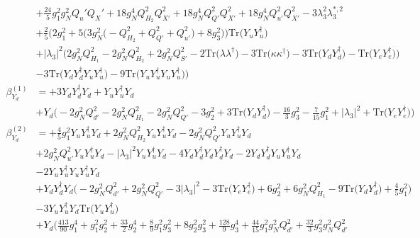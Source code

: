 {\begin{align}
 &+\frac{24}{5} g_{1}^{2} g_{N}^{2} Q_u' Q_X' +18 g_{N}^{4} Q_{H_2}^{2} Q_{X'}^{2} +18 g_{N}^{4} Q_{Q'}^{2} Q_{X'}^{2} +18 g_{N}^{4} Q_{u'}^{2} Q_{X'}^{2} -3 \lambda_{3}^{2} \lambda_{3}^{*,2} \nonumber \\ 
 &+\frac{2}{5} \Big(2 g_{1}^{2}  + 5 \Big(3 g_{N}^{2} \Big(- Q_{H_2}^{2}  + Q_{Q'}^{2} + Q_{u'}^{2}\Big) + 8 g_{3}^{2} \Big)\Big)\mbox{Tr}\Big({Y_u  Y_{u}^{\dagger}}\Big) \nonumber \\ 
 &+|\lambda_3|^2 \Big(2 g_{N}^{2} Q_{H_1}^{2}  -2 g_{N}^{2} Q_{H_2}^{2}  + 2 g_{N}^{2} Q_{S'}^{2}  -2 \mbox{Tr}\Big({\lambda  \lambda^{\dagger}}\Big)  -3 \mbox{Tr}\Big({\kappa  \kappa^{\dagger}}\Big)  -3 \mbox{Tr}\Big({Y_d  Y_{d}^{\dagger}}\Big)  - \mbox{Tr}\Big({Y_e  Y_{e}^{\dagger}}\Big) \Big)\nonumber \\ 
 &-3 \mbox{Tr}\Big({Y_d  Y_{d}^{\dagger}  Y_u  Y_{u}^{\dagger}}\Big) -9 \mbox{Tr}\Big({Y_u  Y_{u}^{\dagger}  Y_u  Y_{u}^{\dagger}}\Big) \Big)\\ 
\beta_{Y_d}^{(1)} & =  
+3 {Y_d  Y_{d}^{\dagger}  Y_d} +{Y_u  Y_{u}^{\dagger}  Y_d}\nonumber \\ 
 &+Y_d \Big(-2 g_{N}^{2} Q_{d'}^{2}  -2 g_{N}^{2} Q_{H_1}^{2}  -2 g_{N}^{2} Q_{Q'}^{2}  -3 g_{2}^{2}  + 3 \mbox{Tr}\Big({Y_d  Y_{d}^{\dagger}}\Big)  -\frac{16}{3} g_{3}^{2}  -\frac{7}{15} g_{1}^{2}  + |\lambda_3|^2 + \mbox{Tr}\Big({Y_e  Y_{e}^{\dagger}}\Big)\Big)\\ 
\beta_{Y_d}^{(2)} & =  
+\frac{4}{5} g_{1}^{2} {Y_u  Y_{u}^{\dagger}  Y_d} +2 g_{N}^{2} Q_{H_2}^{2} {Y_u  Y_{u}^{\dagger}  Y_d} -2 g_{N}^{2} Q_{Q'}^{2} {Y_u  Y_{u}^{\dagger}  Y_d} \nonumber \\ 
 &+2 g_{N}^{2} Q_{u'}^{2} {Y_u  Y_{u}^{\dagger}  Y_d} - |\lambda_3|^2 {Y_u  Y_{u}^{\dagger}  Y_d} -4 {Y_d  Y_{d}^{\dagger}  Y_d  Y_{d}^{\dagger}  Y_d} -2 {Y_d  Y_{d}^{\dagger}  Y_u  Y_{u}^{\dagger}  Y_d} \nonumber \\ 
 &-2 {Y_u  Y_{u}^{\dagger}  Y_u  Y_{u}^{\dagger}  Y_d} \nonumber \\ 
 &+{Y_d  Y_{d}^{\dagger}  Y_d} \Big(-2 g_{N}^{2} Q_{d'}^{2}  + 2 g_{N}^{2} Q_{Q'}^{2}  -3 |\lambda_3|^2  -3 \mbox{Tr}\Big({Y_e  Y_{e}^{\dagger}}\Big)  + 6 g_{2}^{2}  + 6 g_{N}^{2} Q_{H_1}^{2}  -9 \mbox{Tr}\Big({Y_d  Y_{d}^{\dagger}}\Big)  + \frac{4}{5} g_{1}^{2} \Big)\nonumber \\ 
 &-3 {Y_u  Y_{u}^{\dagger}  Y_d} \mbox{Tr}\Big({Y_u  Y_{u}^{\dagger}}\Big) \nonumber \\ 
 &+Y_d \Big(\frac{413}{90} g_{1}^{4} +g_{1}^{2} g_{2}^{2} +\frac{33}{2} g_{2}^{4} +\frac{8}{9} g_{1}^{2} g_{3}^{2} +8 g_{2}^{2} g_{3}^{2} +\frac{128}{9} g_{3}^{4} +\frac{44}{15} g_{1}^{2} g_{N}^{2} Q_{d'}^{2} +\frac{32}{3} g_{3}^{2} g_{N}^{2} Q_{d'}^{2} \nonumber \\ 

\end{align}}
